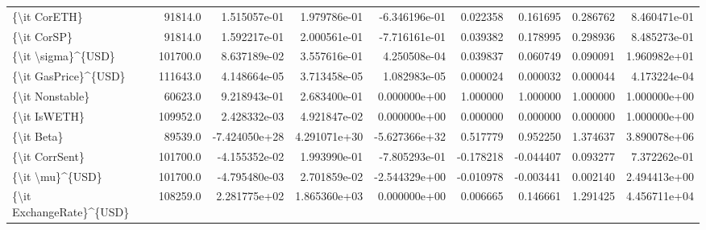 \begin{tabular}{lrrrrrrrr}
\{\textbackslash it CorETH\}             &   91814.0 &  1.515057e-01 &  1.979786e-01 & -6.346196e-01 &  0.022358 &  0.161695 &  0.286762 &  8.460471e-01 \\
\{\textbackslash it CorSP\}              &   91814.0 &  1.592217e-01 &  2.000561e-01 & -7.716161e-01 &  0.039382 &  0.178995 &  0.298936 &  8.485273e-01 \\
\{\textbackslash it \textbackslash sigma\}\textasciicircum \{USD\}       &  101700.0 &  8.637189e-02 &  3.557616e-01 &  4.250508e-04 &  0.039837 &  0.060749 &  0.090091 &  1.960982e+01 \\
\{\textbackslash it GasPrice\}\textasciicircum \{USD\}     &  111643.0 &  4.148664e-05 &  3.713458e-05 &  1.082983e-05 &  0.000024 &  0.000032 &  0.000044 &  4.173224e-04 \\
\{\textbackslash it Nonstable\}          &   60623.0 &  9.218943e-01 &  2.683400e-01 &  0.000000e+00 &  1.000000 &  1.000000 &  1.000000 &  1.000000e+00 \\
\{\textbackslash it IsWETH\}             &  109952.0 &  2.428332e-03 &  4.921847e-02 &  0.000000e+00 &  0.000000 &  0.000000 &  0.000000 &  1.000000e+00 \\
\{\textbackslash it Beta\}               &   89539.0 & -7.424050e+28 &  4.291071e+30 & -5.627366e+32 &  0.517779 &  0.952250 &  1.374637 &  3.890078e+06 \\
\{\textbackslash it CorrSent\}           &  101700.0 & -4.155352e-02 &  1.993990e-01 & -7.805293e-01 & -0.178218 & -0.044407 &  0.093277 &  7.372262e-01 \\
\{\textbackslash it \textbackslash mu\}\textasciicircum \{USD\}          &  101700.0 & -4.795480e-03 &  2.701859e-02 & -2.544329e+00 & -0.010978 & -0.003441 &  0.002140 &  2.494413e+00 \\
\{\textbackslash it ExchangeRate\}\textasciicircum \{USD\} &  108259.0 &  2.281775e+02 &  1.865360e+03 &  0.000000e+00 &  0.006665 &  0.146661 &  1.291425 &  4.456711e+04 \\
\bottomrule
\end{tabular}
